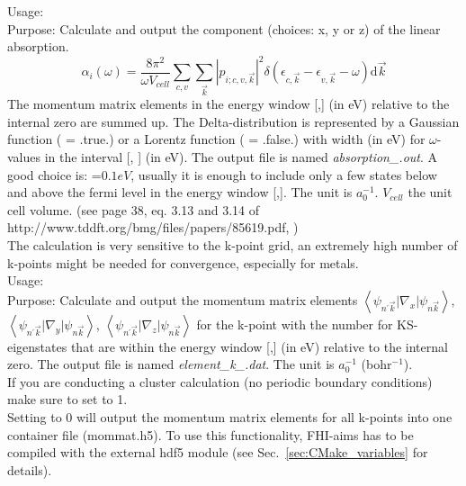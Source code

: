 {
  \noindent
  Usage:         \\[1.0ex]
  Purpose: Calculate and output the  component (choices: x, y or z) of the linear absorption. 
  \begin{equation}
   \alpha_{i}(\omega)=\frac{8\pi^2}{\omega V_{cell}}\sum_{c,v}\sum_{\vec{k}}\left|p_{i;c,v,\vec{k}}\right|^2\delta(\epsilon_{c,\vec{k}}-\epsilon_{v,\vec{k}}-\omega)\mathrm{d}\vec{k}
  \end{equation}
  The momentum matrix elements in the energy window [,] (in eV) relative to the internal zero are summed up. The Delta-distribution is 
  represented by a Gaussian function ( = .true.) or a Lorentz function ( = .false.) with width  (in eV) 
  for  $\omega$-values in the interval [, ] (in eV). The output file is named \textit{absorption\_}\textit{.out}. 
  A good choice is: =$0.1eV$, usually it is enough to include only a few states below and above the fermi level in the 
  energy window [,]. The unit is $a_0^{-1}$. $V_{cell}$ the unit cell volume. (see page 38, eq. 3.13 and 3.14 of http://www.tddft.org/bmg/files/papers/85619.pdf, \cite{Botti2012})\\
  The calculation is very sensitive to the k-point grid, an extremely high number of k-points might be needed for convergence, especially for metals.\\[1.0ex]
}
{
  \noindent
  Usage:    \\[1.0ex]
  Purpose: Calculate and output the momentum matrix elements $\left\langle\psi_{n^{'}\vec{k}}\vert\nabla_x\vert\psi_{n\vec{k}}\right\rangle$, 
  $\left\langle\psi_{n^{'}\vec{k}}\vert\nabla_y\vert\psi_{n\vec{k}}\right\rangle$, $\left\langle\psi_{n^{'}\vec{k}}\vert\nabla_z\vert\psi_{n\vec{k}}\right\rangle$
  for the k-point with the number  for KS-eigenstates that are within the energy window [,] (in eV) relative to the 
  internal zero. The output file is named \textit{element\_k\_}\textit{.dat}. The unit is $a_0^{-1}$ (bohr$^{-1}$).\\
  If you are conducting a cluster calculation (no periodic boundary conditions) make sure to set  to 1.\\
  Setting  to 0 will output the momentum matrix elements for all k-points into one container file (mommat.h5). To use this functionality, FHI-aims 
  has to be compiled with the external hdf5 module (see Sec.~\ref{sec:CMake_variables} for details).\\[1.0ex]
}
